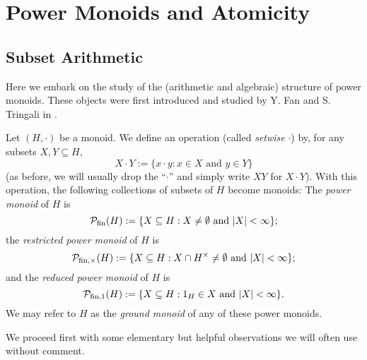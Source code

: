 \chapter{Power Monoids and Atomicity} \label{ch:power monoids}

\section{Subset Arithmetic} \label{sec:pm basics}
Here we embark on the study of the (arithmetic and algebraic) structure of power monoids.
These objects were first introduced and studied by Y. Fan and S. Tringali in \cite{fan-tringali18}.
\begin{defn} \label{def:power monoid}
	Let $(H,\cdot)$ be a monoid.
	We define an operation (called \textit{setwise} $\cdot$) by, for any subsets $X,Y\subseteq H$,
	\[X\cdot Y := \{x\cdot y: x\in X \textrm{ and } y\in Y\} \]
	(as before, we will usually drop the ``$\cdot$'' and simply write $XY$ for $X\cdot Y$).
	With this operation, the following collections of subsets of $H$ become monoids:
	The \textit{power monoid} of $H$ is
	\[\mathcal{P}_{\textrm{fin}}(H) := \{X\subseteq H: X\neq\emptyset \textrm{ and } |X|<\infty \}; \]
	the \textit{restricted power monoid} of $H$ is
	\[\mathcal{P}_{\textrm{fin}, \times}(H) := \{X\subseteq H: X\cap H^\times \neq \emptyset \textrm{ and } |X|<\infty\}; \]
	and the \textit{reduced power monoid} of $H$ is
	\[\mathcal{P}_{\textrm{fin}, 1}(H) := \{X\subseteq H: 1_H\in X \textrm{ and } |X|<\infty\}. \]
	We may refer to $H$ as the \textit{ground monoid} of any of these power monoids.
\end{defn}

We proceed first with some elementary but helpful observations we will often use without comment.

